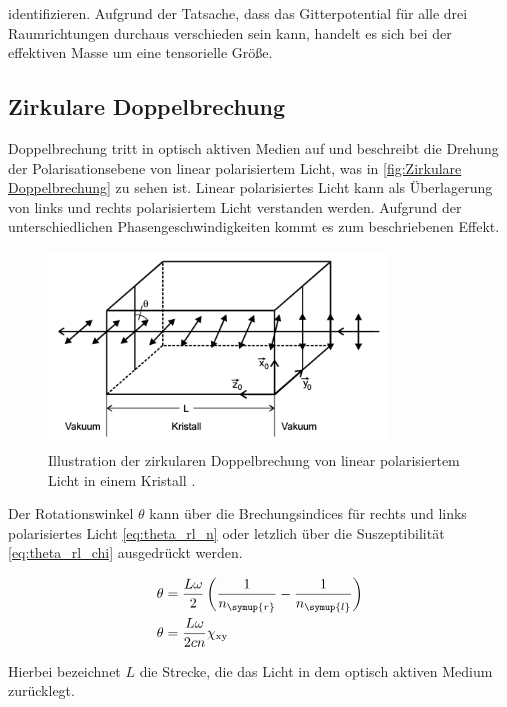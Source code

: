 identifizieren. Aufgrund der Tatsache, dass das Gitterpotential für alle drei Raumrichtungen durchaus verschieden sein kann, handelt es sich bei der effektiven Masse um eine 
tensorielle Größe.


\subsection{Zirkulare Doppelbrechung}
\label{subsec:Zirkulare Doppelbrechung}
Doppelbrechung tritt in optisch aktiven Medien auf und beschreibt die Drehung der Polarisationsebene von linear polarisiertem Licht, was in \autoref{fig:Zirkulare Doppelbrechung} zu 
sehen ist. Linear polarisiertes Licht kann als Überlagerung von links und rechts polarisiertem Licht verstanden werden. Aufgrund der unterschiedlichen Phasengeschwindigkeiten kommt es
zum beschriebenen Effekt.

\begin{figure}
    \centering
    \includegraphics[width=0.8\textwidth]{content/pics/Zirkulare_Doppelbrechung.png}
    \caption{Illustration der zirkularen Doppelbrechung von linear polarisiertem Licht in einem Kristall \cite{V46_Anhang}.}
    \label{fig:Zirkulare Doppelbrechung}
\end{figure}

Der Rotationswinkel $\theta$ kann über die Brechungsindices für rechts und links polarisiertes Licht \eqref{eq:theta_rl_n} oder letzlich über die 
Suszeptibilität \eqref{eq:theta_rl_chi} ausgedrückt werden.

\begin{align}
    \theta &= \frac{L\omega}{2}\left(\frac{1}{n_{\symup{r}}}-\frac{1}{n_{\symup{l}}}\right) \label{eq:theta_rl_n} \\
    \theta &= \frac{L\omega}{2cn}\chi_{\text{xy}} \label{eq:theta_rl_chi} 
\end{align}

Hierbei bezeichnet $L$ die Strecke, die das Licht in dem optisch aktiven Medium zurücklegt.

